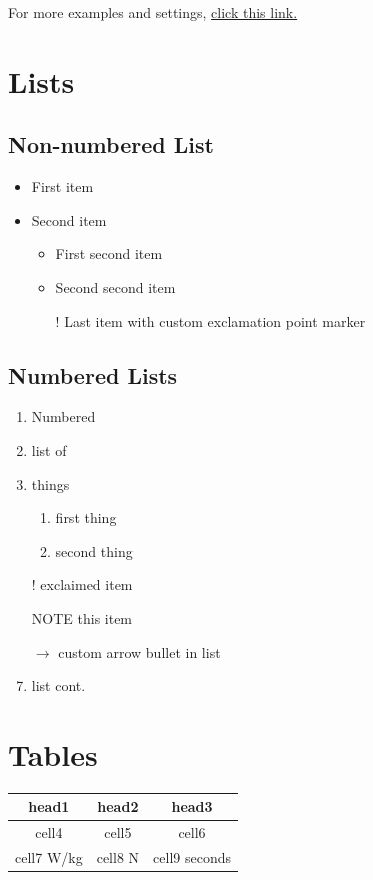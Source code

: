 \documentclass{article}
\begin{document}
For more examples and settings, \href{http://overleaf.com/learn/latex/Inserting_Images}{click this link.}

\pagebreak

\section{Lists}

\subsection{Non-numbered List}
\begin{itemize}
	\item First item
	\item Second item
	\begin{itemize}
		\item First second item
		\item Second second item
	\item[!] Last item with custom exclamation point marker	
	\end{itemize}
\end{itemize}

\subsection{Numbered Lists}
\begin{enumerate}
	\item Numbered
	\item list of 
	\item things
	\begin{enumerate}
		\item first thing
		\item second thing
	\end{enumerate}
	\item[!] exclaimed item
	\item[NOTE] this item
	\item[$\rightarrow$] custom arrow bullet in list
	\item list cont.
\end{enumerate}


\section{Tables}
\begin{center}
\begin{tabular}{ ||c|c|c|| } 
 \hline
 \textbf{head1} & \textbf{head2} & \textbf{head3} \\ 
 \hline
 \hline
 cell4 & cell5 & cell6 \\ 
 \hline
 cell7 W/kg  & 
 cell8 N  & 
 cell9 seconds \\ 
 \hline
\end{tabular}
\end{center}
\end{document}
